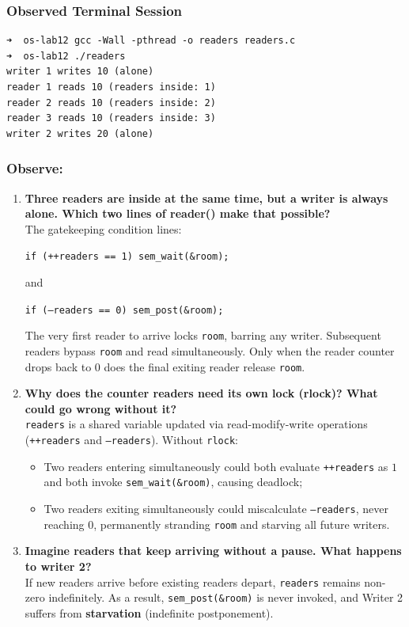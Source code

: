 \documentclass{labreport}
\begin{document}
\subsubsection{Observed Terminal Session}
\begin{lstlisting}[style=bash]
➜  os-lab12 gcc -Wall -pthread -o readers readers.c
➜  os-lab12 ./readers
writer 1 writes 10 (alone)
reader 1 reads 10 (readers inside: 1)
reader 2 reads 10 (readers inside: 2)
reader 3 reads 10 (readers inside: 3)
writer 2 writes 20 (alone)
\end{lstlisting}

\subsubsection*{Observe:}
\begin{enumerate}[leftmargin=*]
    \item \textbf{Three readers are inside at the same time, but a writer is always alone. Which two lines of reader() make that possible?}\\[0.2em]
    The gatekeeping condition lines:
    \begin{center}
        \texttt{if (++readers == 1) sem\_wait(\&room);}
    \end{center}
    and
    \begin{center}
        \texttt{if (--readers == 0) sem\_post(\&room);}
    \end{center}
    The very first reader to arrive locks \texttt{room}, barring any writer. Subsequent readers bypass \texttt{room} and read simultaneously. Only when the reader counter drops back to $0$ does the final exiting reader release \texttt{room}.

    \item \textbf{Why does the counter readers need its own lock (rlock)? What could go wrong without it?}\\[0.2em]
    \texttt{readers} is a shared variable updated via read-modify-write operations (\texttt{++readers} and \texttt{--readers}). Without \texttt{rlock}:
    \begin{itemize}[noitemsep]
        \item Two readers entering simultaneously could both evaluate \texttt{++readers} as $1$ and both invoke \texttt{sem\_wait(\&room)}, causing deadlock;
        \item Two readers exiting simultaneously could miscalculate \texttt{--readers}, never reaching $0$, permanently stranding \texttt{room} and starving all future writers.
    \end{itemize}

    \item \textbf{Imagine readers that keep arriving without a pause. What happens to writer 2?}\\[0.2em]
    If new readers arrive before existing readers depart, \texttt{readers} remains non-zero indefinitely. As a result, \texttt{sem\_post(\&room)} is never invoked, and Writer 2 suffers from \textbf{starvation} (indefinite postponement).
\end{enumerate}
\end{document}
